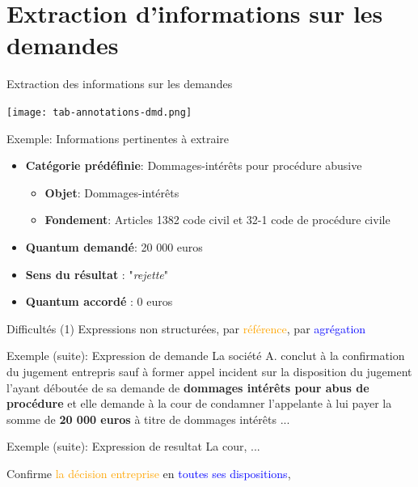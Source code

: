 \documentclass[newPxFont,pagenumber]{beamer}
\begin{document}
\section{Extraction d'informations sur les demandes}

\begin{frame}{Extraction des informations sur les demandes}
\begin{table}
\centering \texttt{[image: tab-annotations-dmd.png]}
\caption{\scriptsize Tableau des informations sur les demandes}
\end{table}

\begin{block}{Exemple: Informations pertinentes à extraire}%
\begin{itemize}\scriptsize
\item \textbf{Catégorie prédéfinie}: Dommages-intérêts pour procédure abusive
\begin{itemize}\scriptsize
\item \textbf{Objet}: Dommages-intérêts
\item \textbf{Fondement}: Articles 1382 code civil et 32-1 code de procédure civile
\end{itemize}
\item \textbf{Quantum demandé}: 20 000 euros
\item \textbf{Sens du résultat} : "\textit{rejette}"
\item \textbf{Quantum accordé} : 0 euros
\end{itemize}
\end{block}
\end{frame}

\begin{frame}{Difficultés (1)}
Expressions non structurées, par  \textcolor{orange}{référence}, par \textcolor{blue}{agrégation}

\begin{exampleblock}{Exemple (suite): Expression de demande} %
La société A. conclut à la confirmation du jugement entrepris sauf à
former appel incident sur la disposition du jugement l'ayant déboutée de sa
demande de \textbf{dommages intérêts pour abus de procédure} et elle demande à la cour de
condamner l'appelante à lui payer la somme de \textbf{20 000 euros} à titre de dommages
intérêts ...

\end{exampleblock}

\begin{exampleblock}{Exemple (suite): Expression de resultat}
La cour, ... 

Confirme \textcolor{orange}{la décision entreprise} en \textcolor{blue}{toutes ses dispositions},
\end{exampleblock}
\end{frame}
\end{document}

